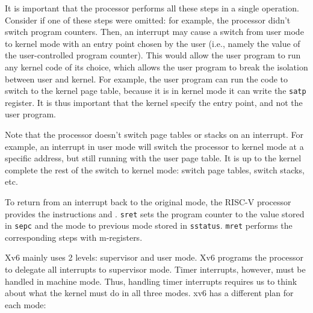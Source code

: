 It is important that the processor performs all these steps in a
single operation.  Consider if one of these steps were omitted: for
example, the processor didn't switch program counters.  Then, an
interrupt may cause a switch from user mode to kernel mode with an
entry point chosen by the user (i.e., namely the value of the
user-controlled program counter).  This would allow the user program
to run any kernel code of its choice, which allows the user program to
break the isolation between user and kernel. For example, the user
program can run the code to switch to the kernel page table, because
it is in kernel mode it can write the \lstinline{satp} register.  It
is thus important that the kernel specify the entry point, and not the
user program.

Note that the processor doesn't switch page tables or stacks on an
interrupt.  For example, an interrupt in user mode will switch the
processor to kernel mode at a specific address, but still running with
the user page table.  It is up to the kernel complete the rest of the
switch to kernel mode: switch page tables, switch stacks, etc.

To return from an interrupt back to the original mode, the RISC-V
processor provides the instructions  and
. \lstinline{sret} sets the program counter to the
value stored in \lstinline{sepc} and the mode to previous mode stored
in \lstinline{sstatus}. \lstinline{mret} performs the corresponding
steps with m-registers.

Xv6 mainly uses 2 levels: supervisor and user mode.  Xv6 programs the
processor to delegate all interrupts to supervisor mode. Timer
interrupts, however, must be handled in machine mode.  Thus, handling
timer interrupts requires us to think about what the kernel must do in
all three modes. xv6 has a different plan for each mode:

